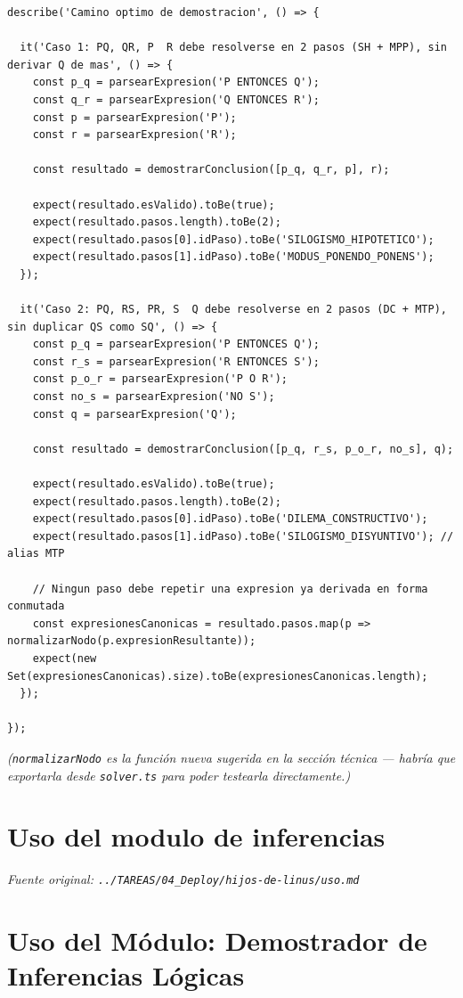 \documentclass[11pt,a4paper,openany]{book}
\begin{document}
\begin{lstlisting}[language={},basicstyle=\ttfamily\scriptsize]
describe('Camino optimo de demostracion', () => {

  it('Caso 1: PQ, QR, P  R debe resolverse en 2 pasos (SH + MPP), sin derivar Q de mas', () => {
    const p_q = parsearExpresion('P ENTONCES Q');
    const q_r = parsearExpresion('Q ENTONCES R');
    const p = parsearExpresion('P');
    const r = parsearExpresion('R');

    const resultado = demostrarConclusion([p_q, q_r, p], r);

    expect(resultado.esValido).toBe(true);
    expect(resultado.pasos.length).toBe(2);
    expect(resultado.pasos[0].idPaso).toBe('SILOGISMO_HIPOTETICO');
    expect(resultado.pasos[1].idPaso).toBe('MODUS_PONENDO_PONENS');
  });

  it('Caso 2: PQ, RS, PR, S  Q debe resolverse en 2 pasos (DC + MTP), sin duplicar QS como SQ', () => {
    const p_q = parsearExpresion('P ENTONCES Q');
    const r_s = parsearExpresion('R ENTONCES S');
    const p_o_r = parsearExpresion('P O R');
    const no_s = parsearExpresion('NO S');
    const q = parsearExpresion('Q');

    const resultado = demostrarConclusion([p_q, r_s, p_o_r, no_s], q);

    expect(resultado.esValido).toBe(true);
    expect(resultado.pasos.length).toBe(2);
    expect(resultado.pasos[0].idPaso).toBe('DILEMA_CONSTRUCTIVO');
    expect(resultado.pasos[1].idPaso).toBe('SILOGISMO_DISYUNTIVO'); // alias MTP

    // Ningun paso debe repetir una expresion ya derivada en forma conmutada
    const expresionesCanonicas = resultado.pasos.map(p => normalizarNodo(p.expresionResultante));
    expect(new Set(expresionesCanonicas).size).toBe(expresionesCanonicas.length);
  });

});
\end{lstlisting}

\textit{(\texttt{normalizarNodo} es la función nueva sugerida en la sección técnica --- habría que exportarla desde \texttt{solver.ts} para poder testearla directamente.)}


\section{Uso del modulo de inferencias}
\textit{Fuente original: \texttt{../TAREAS/04\_Deploy/hijos-de-linus/uso.md}}

\section{Uso del Módulo: Demostrador de Inferencias Lógicas}
\end{document}
